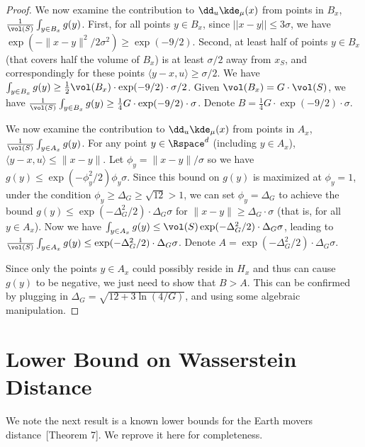 \documentclass[11pt]{myclass}
\begin{document}
\begin{proof}
We now examine the contribution to $\dd_u \kde_\mu(x)$ from points in $B_x$, 
$\frac{1}{\vol(S)}\int_{y \in B_x} g(y)$.  First, for all points $y \in B_x$, since $||x - y|| \leq 3\sigma$, we have $\exp(-\|x-y\|^2/2\sigma^2) \geq \exp(-9/2)$. 
Second, at least half of points $y \in B_x$ (that covers half the volume of $B_x$) is at least $\sigma/2$ away from $x_S$, and correspondingly for these points $\langle y-x,u\rangle \geq \sigma/2$. 
We have $\int_{y \in B_x} g(y) \geq \frac{1}{2} \vol(B_x) \cdot \exp(-9/2) \cdot \sigma/2$. Given $\vol(B_x) = G \cdot \vol(S)$, we have $\frac{1}{\vol(S)}\int_{y \in B_x} g(y) \geq  \frac{1}{4} G \cdot \exp(-9/2) \cdot \sigma$.   
Denote $B =  \frac{1}{4} G \cdot \exp(-9/2) \cdot \sigma$. 

We now examine the contribution to $\dd_u \kde_\mu(x)$ from points in $A_x$, 
$\frac{1}{\vol(S)}\int_{y \in A_x} g(y)$. For any point $y \in \Rspace^d$ (including $y \in A_x$), 
$\langle y-x,u\rangle \leq \|x-y\|$. 
Let $\phi_y = \|x-y\|/\sigma$ so we have $g(y) \leq \exp(-\phi_y^2/2) \phi_y \sigma$. 
Since this bound on $g(y)$ is maximized at $\phi_y = 1$, under the condition $\phi_y \geq \Delta_G \geq \sqrt{12}>1$, we can set $\phi_y=\Delta_G$ to achieve the bound $g(y) \leq \exp(-\Delta_G^2/2) \cdot \Delta_G \sigma$ for $\|x-y\| \geq \Delta_G \cdot \sigma$ (that is, for all $y \in A_x$).  
Now we have $\int_{y \in A_x} g(y) \leq \vol(S) \exp(-\Delta_G^2/2) \cdot \Delta_G \sigma$, leading to $\frac{1}{\vol(S)} \int_{y \in A_x} g(y) \leq  \exp(-\Delta_G^2/2) \cdot \Delta_G \sigma$. Denote $A = \exp(-\Delta_G^2/2) \cdot \Delta_G \sigma$. 

Since only the points $y \in A_x$ could possibly reside in $H_x$ and thus can cause $g(y)$ to be negative, we just need to show that $B > A$.  
This can be confirmed by plugging in $\Delta_G = \sqrt{12 + 3\ln(4/G)}$, and using some algebraic manipulation.  
\end{proof}







\section{Lower Bound on Wasserstein Distance}
\label{app:stability}

We note the next result is a known lower bounds for the Earth movers distance~\cite{Coh99}[Theorem 7].  We reprove it here for completeness.  
\end{document}
